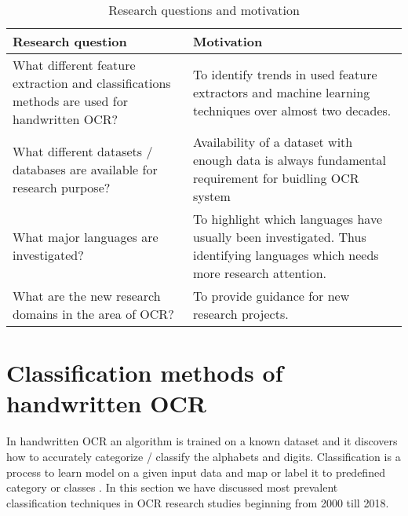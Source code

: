 \documentclass{article}
\begin{document}
\begin{table} [!htb]
\centering
	
	\caption{Research questions and motivation}
	\begin{tabular}{| p{8cm} |  p{8cm} |}
		\hline
		\textbf{Research question}  & \textbf{Motivation} \\ \hline
		
		What different feature extraction and classifications methods are used for handwritten OCR?  & To identify trends in used feature extractors and machine learning techniques over almost two decades.  \\ \hline
		
		


		
		What different datasets / databases are  available for research purpose?  & Availability of a dataset with enough data is always fundamental requirement for buidling OCR system \cite{KHAN201961}  \\ \hline
		
		
		What major languages are investigated?   & To highlight which languages have usually been investigated. Thus identifying languages which needs more research attention. \\ \hline
		
		What are the new research domains in the area of OCR?   & To provide guidance for new research projects.  \\ \hline
		
	\end{tabular}
\label{Tab:RQs}
\end{table}











\section{Classification methods of handwritten OCR} \label{classi}

In handwritten OCR an algorithm is trained on a known dataset and it discovers how to accurately categorize / classify the alphabets and digits. Classification is a process to learn model on a given input data and map or label it to predefined category or classes \cite{Mitchell}. In this section we have discussed most prevalent classification techniques in OCR research studies beginning from 2000 till 2018. 
\end{document}
